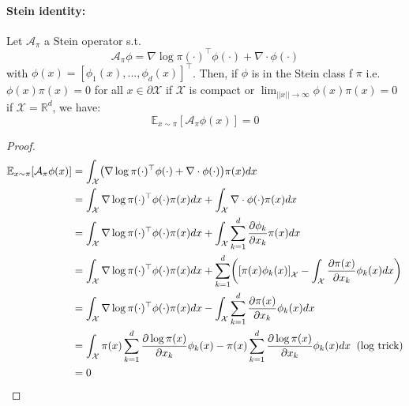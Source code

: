 \documentclass[runningheads,a4paper]{llncs}
\newcommand{\R}{\mathbb{R}}
\newcommand{\E}{\mathbb{E}}
\newcommand{\X}{\mathcal{X}}
\newcommand{\A}{\mathcal{A}}
\newcommand{\diff}[2]{\frac{\partial #1}{\partial #2}}
\DeclarePairedDelimiter{\pare}{(}{)}
\DeclarePairedDelimiter{\sq}{[}{]}
\begin{document}
\paragraph{\bf Stein identity:}
Let $\A_\pi$ a Stein operator s.t.
$$
\A_\pi \phi = \nabla \log \pi(\cdot)^\top \phi(\cdot) + \nabla \cdot \phi(\cdot)
$$
with $\phi(x) = [\phi_1(x), ..., \phi_d(x)]^\top$.
Then, if $\phi$ is in the Stein class f $\pi$ i.e. $\phi(x)\pi(x) = 0$ for all $x \in \partial \X$
if $\X$ is compact or $\lim_{||x|| \to \infty} \phi(x) \pi(x) = 0$ if $\X = \R^d$, we have:
\begin{equation}
  \E_{x \sim \pi}[\A_\pi \phi (x)] = 0
  \label{eq:stein_id}
\end{equation}
\begin{proof}
  \begin{align*}
    \E_{x \sim \pi}[\A_\pi \phi (x)] &=
      \int_\X \pare*{ \nabla \log \pi(\cdot)^\top \phi(\cdot) + \nabla \cdot \phi(\cdot) } \pi(x) dx \\
    &= \int_\X \nabla \log \pi(\cdot)^\top \phi(\cdot) \pi(x) dx + \int_\X \nabla \cdot \phi(\cdot) \pi(x) dx \\
    &= \int_\X \nabla \log \pi(\cdot)^\top \phi(\cdot) \pi(x) dx +
      \int_\X \sum_{k=1}^d \diff{\phi_k}{x_k} \pi(x) dx \\
    &= \int_\X \nabla \log \pi(\cdot)^\top \phi(\cdot) \pi(x) dx +
    \sum_{k=1}^d \pare*{ \sq*{\pi(x) \phi_k(x)}_\X - \int_\X \diff{\pi(x)}{x_k} \phi_k(x) dx} \\
    &= \int_\X \nabla \log \pi(\cdot)^\top \phi(\cdot) \pi(x) dx -
      \int_\X \sum_{k=1}^d \diff{\pi(x)}{x_k} \phi_k(x) dx \\
    &= \int_\X  \pi(x) \sum_{k=1}^d \diff{\log \pi(x)}{x_k}\phi_k(x) -
    \pi(x) \sum_{k=1}^d \diff{\log \pi(x)}{x_k} \phi_k(x) dx \;\; \text{(log trick)} \\
    &= 0
  \end{align*}
\end{proof}
\end{document}
